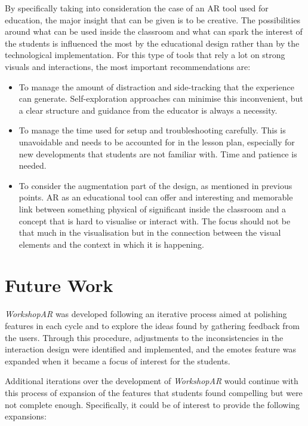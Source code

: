 By specifically taking into consideration the case of an AR tool used for education, the major insight that can be given is to be creative. The possibilities around what can be used inside the classroom
and what can spark the interest of the students is influenced the most by the educational design rather than by the technological implementation. For this type of tools that rely a lot on strong visuals
and interactions, the most important recommendations are:

\begin{itemize}
    \item To manage the amount of distraction and side-tracking that the experience can generate. Self-exploration approaches can minimise this inconvenient, but a clear structure and guidance from the
    educator is always a necessity.
    \item To manage the time used for setup and troubleshooting carefully. This is unavoidable and needs to be accounted for in the lesson plan, especially for new developments that students are not
    familiar with. Time and patience is needed.
    \item To consider the augmentation part of the design, as mentioned in previous points. AR as an educational tool can offer and interesting and memorable link between something physical of significant
    inside the classroom and a concept that is hard to visualise or interact with. The focus should not be that much in the visualisation but in the connection between the visual elements and the context
    in which it is happening.
\end{itemize}

\section{Future Work \label{sec:7-3}}

\emph{WorkshopAR} was developed following an iterative process aimed at polishing features in each cycle and to explore the ideas found by gathering feedback from the users. Through this
procedure, adjustments to the inconsistencies in the interaction design were identified and implemented, and the emotes feature was expanded when it became a focus of interest for the students.

Additional iterations over the development of \emph{WorkshopAR} would continue with this process of expansion of the features that students found compelling but were not complete enough.
Specifically, it could be of interest to provide the following expansions:

